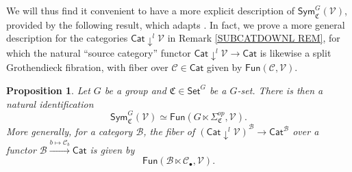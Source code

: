 \documentclass[a4paper,10pt
,draft
]{article}%
\numberwithin{equation}{section}
\numberwithin{figure}{section}
\newtheorem{proposition}[equation]{Proposition}%
\theoremstyle{definition} %
\newcommand{\V}{\ensuremath{\mathcal V}}
\newcommand{\1}{\ensuremath{\mathbbm 1}}%
\begin{document}
We will thus find it convenient to have a more explicit description of
$\mathsf{Sym}^G_{\mathfrak{C}}(\V)$,
provided by the following result, 
which adapts
\cite[Lemma A.6]{BP_geo}.
In fact, we prove a more general description
for the categories $\mathsf{Cat} \downarrow^l \mathcal{V}$
in Remark \ref{SUBCATDOWNL REM},
for which the natural ``source category'' functor
$\mathsf{Cat} \downarrow^l \mathcal{V} \to \mathsf{Cat}$
is likewise a split Grothendieck fibration,
with fiber over $\mathcal{C} \in \mathsf{Cat}$
given by $\mathsf{Fun}(\mathcal{C},\mathcal{V})$.



\begin{proposition}\label{EQUIVFNCON PROP}
Let $G$ be a group and $\mathfrak{C} \in \mathsf{Set}^G$
be a $G$-set. There is then a natural identification
\[
\mathsf{Sym}^G_{\mathfrak{C}}(\V)
\simeq
\mathsf{Fun}(G \ltimes \Sigma^{op}_{\mathfrak{C}},\V).
\]
More generally, for a category $\mathcal{B}$,
the fiber of
$\left(\mathsf{Cat} \downarrow^l \V \right)^{\mathcal{B}}
\to \mathsf{Cat}^{\mathcal{B}}$
over a functor
$\mathcal{B} \xrightarrow{b \mapsto \mathcal{C}_b} \mathsf{Cat}$
is given by
\begin{equation}\label{FUNBLTICV EQ}
\mathsf{Fun}(\mathcal{B} \ltimes \mathcal{C}_{\bullet},\V).
\end{equation}
\end{proposition}
\end{document}
